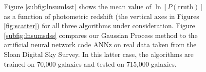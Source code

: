 \documentclass[useAMS,usenatbib,tightenlines,11pt,preprint]{aastex}
\begin{document}
\begin{figure}
\caption{
Figure \ref{subfig:lnsumlsst} shows the mean value of
$\ln[P(\text{truth})]$ as a function of photometric redshift (the vertical
axes in Figures \ref{fig:scatter}) for all
three algorithms under consideration.  
Figure \ref{subfig:lnsumsdss} compares our Gaussian Process method
to the artificial neural network code ANNz \cite{annz} on real
data taken from the Sloan Digital Sky Survey.  In this latter case, the
algorithms are trained on 70,000 galaxies and tested on 715,000 galaxies.
}
\label{fig:gp}
\end{figure}
\end{document}
